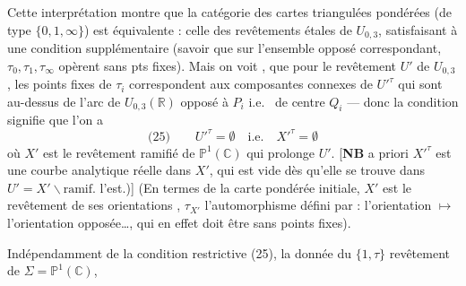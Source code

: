 \documentclass[11pt,a4paper]{article}
\begin{document}
Cette interprétation montre que la catégorie des cartes 
triangulées pondérées (de type $\{0, 1, \infty\}$) est équivalente :
 celle des revêtements
 étales de $U_{0,3}$,  
satisfaisant à une condition supplémentaire (savoir que sur l'ensemble opposé
correspondant, $\tau_0, \tau_1, \tau_\infty$ opèrent sans pts fixes). Mais on
voit , \struck{\ill{}} que pour le 
revêtement $U'$ de $U_{0,3}$, les points fixes de $\tau_i$ correspondent aux
composantes connexes de $U'^\tau$ qui sont au-dessus de l'arc de
$U_{0,3}(\mathbb{R})$ opposé à $P_i$ i.e.\  de centre $Q_i$ ---
donc la condition signifie que \struck{\ill{}} l'on a
\[
  \text{(25)} \qquad U'^\tau = \emptyset \quad \text{i.e.} \quad
  X'^\tau = \emptyset
\]
où $X'$ est le revêtement ramifié de $\mathbb{P}^1(\mathbb{C})$ qui prolonge
$U'$. [\textbf{NB} \struck{\ill{}} a priori $X'^\tau$ est une courbe analytique
réelle   dans $X'$, qui \struck{\ill{}}
 est vide dès qu'elle se trouve dans
$U' = X' \smallsetminus \text{ramif.}$ \struck{(\ill{})} l'est.)]
 (En termes de la carte pondérée initiale, $X'$ est le revêtement de
ses orientations , $\tau_{X'}$  l'automorphisme défini
par \ill{} : l'orientation $\mapsto$ l'orientation opposée…, qui en effet doit
être sans points fixes).

Indépendamment de la condition restrictive (25), la donnée du $\{1, \tau\}$
revêtement  de $\Sigma = \mathbb{P}^1(\mathbb{C})$,
\end{document}
